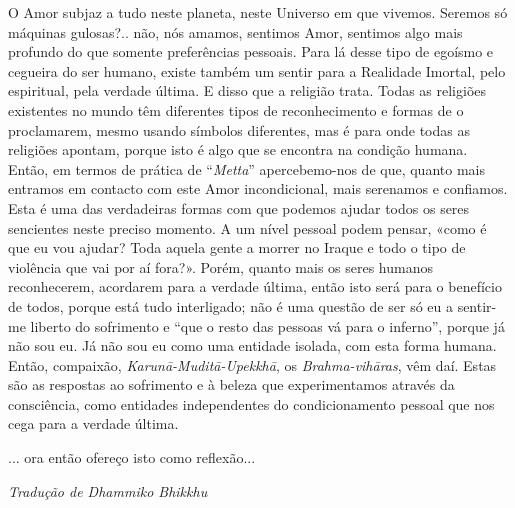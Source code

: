 O Amor subjaz a tudo neste planeta, neste Universo em que vivemos.
Seremos só máquinas gulosas?.. não, nós amamos, sentimos Amor, sentimos
algo mais profundo do que somente preferências pessoais. Para lá desse
tipo de egoísmo e cegueira do ser humano, existe também um sentir para a
Realidade Imortal, pelo espiritual, pela verdade última. E disso que a
religião trata. Todas as religiões existentes no mundo têm diferentes
tipos de reconhecimento e formas de o proclamarem, mesmo usando símbolos
diferentes, mas é para onde todas as religiões apontam, porque isto é
algo que se encontra na condição humana. Então, em termos de prática de
``\emph{Metta}'' apercebemo-nos de que, quanto mais entramos em contacto
com este Amor incondicional, mais serenamos e confiamos. Esta é uma das
verdadeiras formas com que podemos ajudar todos os seres sencientes
neste preciso momento. A um nível pessoal podem pensar, «como é que eu
vou ajudar? Toda aquela gente a morrer no Iraque e todo o tipo de
violência que vai por aí fora?». Porém, quanto mais os seres humanos
reconhecerem, acordarem para a verdade última, então isto será para o
benefício de todos, porque está tudo interligado; não é uma questão de
ser só eu a sentir-me liberto do sofrimento e ``que o resto das pessoas
vá para o inferno'', porque já não sou eu. Já não sou eu como uma
entidade isolada, com esta forma humana. Então, compaixão,
\emph{Karunā-Muditā-Upekkhā}, os \emph{Brahma-vihāras}, vêm daí. Estas
são as respostas ao sofrimento e à beleza que experimentamos através da
consciência, como entidades independentes do condicionamento pessoal que
nos cega para a verdade última.

... ora então ofereço isto como reflexão...

\bigskip

{\raggedleft\itshape
  Tradução de Dhammiko Bhikkhu
\par}
